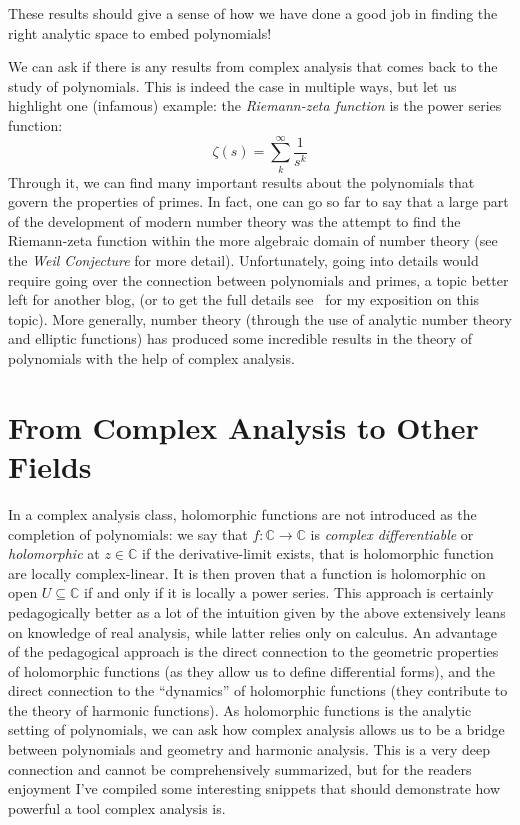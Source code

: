 \documentclass{article}
\newcommand{\C}{\mathbb{C}}
\newcommand{\sse}{\subseteq}
\begin{document}
These results should give a sense of how we have done a good job in finding the right analytic space to
embed polynomials!

We can ask if there is any results from complex analysis that comes back to the
study of polynomials. This is indeed the case in multiple ways, but let us highlight one (infamous) example: the
\emph{Riemann-zeta function} is the power series function:
\[
  \zeta(s) = \sum_k^\infty \frac{1}{s^k}
\]
Through it, we can find many important results about the polynomials that govern the properties of primes. In
fact, one can go so far to say that a large part of the development of modern number theory was the attempt to
find the Riemann-zeta function within the more algebraic domain of number theory (see the \emph{Weil
Conjecture} for more detail). Unfortunately, going into details would require going over the connection
between polynomials and primes, a topic better left for another blog, (or to get the full details
see~\cite[chapter~3]{nathanaelchwojko-srawleyEverythingYouNeed} for my exposition on this topic). More
generally, number theory (through the use of analytic number theory and elliptic functions) has produced some
incredible results in the theory of polynomials with the help of complex analysis.


\section{From Complex Analysis to Other Fields}

In a complex analysis class, holomorphic functions are not introduced as the completion of polynomials: we say
that $f: \C \to \C$ is \emph{complex differentiable} or \emph{holomorphic} at $z \in \C$ if the
derivative-limit exists, that is holomorphic function are locally complex-linear. It is then
proven that a function is holomorphic on open $U \sse \C$ if and only if it is locally a power series. This
approach is certainly pedagogically better as a lot of the intuition given by the above extensively leans on
knowledge of real analysis, while latter relies only on calculus. An advantage of the pedagogical approach is the direct
connection to the geometric properties of holomorphic functions (as they allow us to define differential forms),
and the direct connection to the ``dynamics'' of holomorphic functions (they contribute to the theory of
harmonic functions). As holomorphic functions is the analytic setting of polynomials, we can ask how complex
analysis allows us to be a bridge between polynomials and geometry and harmonic analysis. This is a very deep
connection and cannot be comprehensively summarized, but for the readers enjoyment I've compiled some
interesting snippets that should demonstrate how powerful a tool complex analysis is.
\end{document}
